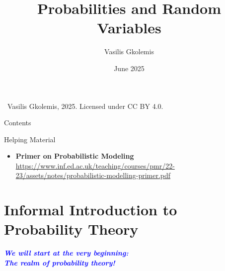 \documentclass{beamer}
\title{Probabilities and Random Variables}
\author{Vasilis Gkolemis}
\institute{ATHENA RC | HUA}
\date{June 2025}
\begin{document}
\begin{frame}
  \titlepage
  \vfill
  \footnotesize
  \textcopyright\
  Vasilis Gkolemis, 2025. Licensed under CC BY 4.0.
\end{frame}

\begin{frame}{Contents}
  \tableofcontents
\end{frame}


\begin{frame}{Helping Material}
  \begin{itemize}
    \item \textbf{Primer on Probabilistic Modeling} \url{https://www.inf.ed.ac.uk/teaching/courses/pmr/22-23/assets/notes/probabilistic-modelling-primer.pdf}
  \end{itemize}
\end{frame}


\section{Informal Introduction to Probability Theory}

\begin{frame}{}
    \begin{center}
        \textcolor{blue}{\bfseries \emph{We will start at the very beginning: \\
The realm of probability theory!}}
    \end{center}
\end{frame}
\end{document}
